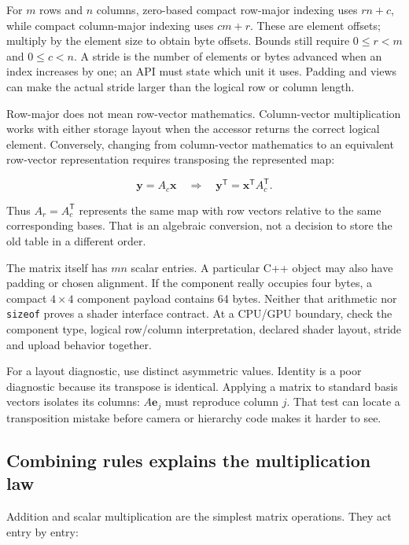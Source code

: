 For \(m\) rows and \(n\) columns, zero-based compact row-major indexing uses \(rn+c\), while compact column-major indexing uses \(cm+r\). These are element offsets; multiply by the element size to obtain byte offsets. Bounds still require \(0\le r<m\) and \(0\le c<n\). A stride is the number of elements or bytes advanced when an index increases by one; an API must state which unit it uses. Padding and views can make the actual stride larger than the logical row or column length.

Row-major does not mean row-vector mathematics. Column-vector multiplication works with either storage layout when the accessor returns the correct logical element. Conversely, changing from column-vector mathematics to an equivalent row-vector representation requires transposing the represented map:

\[
\mathbf y=A_c\mathbf x
\quad\Longrightarrow\quad
\mathbf y^{\mathsf T}=\mathbf x^{\mathsf T}A_c^{\mathsf T}.
\]

Thus \(A_r=A_c^{\mathsf T}\) represents the same map with row vectors relative to the same corresponding bases. That is an algebraic conversion, not a decision to store the old table in a different order.

The matrix itself has \(mn\) scalar entries. A particular C++ object may also have padding or chosen alignment. If the component really occupies four bytes, a compact \(4\times4\) component payload contains 64 bytes. Neither that arithmetic nor \texttt{sizeof} proves a shader interface contract. At a CPU/GPU boundary, check the component type, logical row/column interpretation, declared shader layout, stride and upload behavior together.

For a layout diagnostic, use distinct asymmetric values. Identity is a poor diagnostic because its transpose is identical. Applying a matrix to standard basis vectors isolates its columns: \(A\mathbf e_j\) must reproduce column \(j\). That test can locate a transposition mistake before camera or hierarchy code makes it harder to see.

\subsection{Combining rules explains the multiplication law}\label{01-foundations-i-ch018-combining-rules-explains-the-multiplication-law}

Addition and scalar multiplication are the simplest matrix operations. They act entry by entry:

